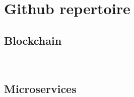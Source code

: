 \documentclass[]{deedy-resume-openfont}
\begin{document}
\begin{minipage}[t]{0.33\textwidth}
\section{Github repertoire}
\subsection{Blockchain}
\href{https://github.com/hiteshjoshi1/dns-dapp}{} \\
\subsection{Microservices}
\href{https://github.com/hiteshjoshi1/microservice-docker-cart-example}{} \\


\sectionsep
%
%

\end{minipage} 
\hfill
\end{document}
